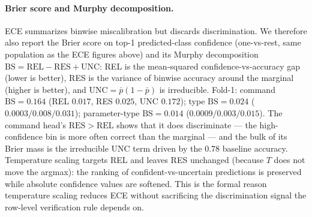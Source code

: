 \documentclass[11pt,a4paper]{article}
\begin{document}
\paragraph{Brier score and Murphy decomposition.} ECE summarizes binwise miscalibration but discards discrimination. We therefore also report the Brier score on top-1 predicted-class confidence (one-vs-rest, same population as the ECE figures above) and its Murphy decomposition $\mathrm{BS}\!=\!\mathrm{REL}\!-\!\mathrm{RES}\!+\!\mathrm{UNC}$: REL is the mean-squared confidence-vs-accuracy gap (lower is better), RES is the variance of binwise accuracy around the marginal (higher is better), and $\mathrm{UNC}\!=\!\bar{p}(1-\bar{p})$ is irreducible. Fold-1: command $\mathrm{BS}\!=\!0.164$ (REL $0.017$, RES $0.025$, UNC $0.172$); type $\mathrm{BS}\!=\!0.024$ ($0.0003 / 0.008 / 0.031$); parameter-type $\mathrm{BS}\!=\!0.014$ ($0.0009 / 0.003 / 0.015$). The command head's $\mathrm{RES}\!>\!\mathrm{REL}$ shows that it does discriminate --- the high-confidence bin is more often correct than the marginal --- and the bulk of its Brier mass is the irreducible UNC term driven by the $0.78$ baseline accuracy. Temperature scaling targets REL and leaves RES unchanged (because $T$ does not move the argmax): the ranking of confident-vs-uncertain predictions is preserved while absolute confidence values are softened. This is the formal reason temperature scaling reduces ECE without sacrificing the discrimination signal the row-level verification rule depends on.
\end{document}
